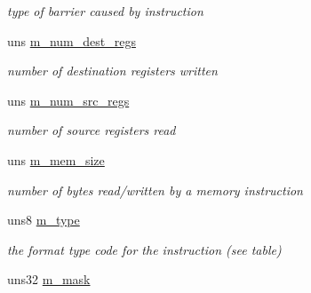 \begin{DoxyCompactItemize}
\begin{DoxyCompactList}\small\item\em type of barrier caused by instruction \item\end{DoxyCompactList}\item 
\hypertarget{structtable__info__s_a0119d841b793e83f3691aecf6487924c}{
uns \hyperlink{structtable__info__s_a0119d841b793e83f3691aecf6487924c}{m\_\-num\_\-dest\_\-regs}}
\label{structtable__info__s_a0119d841b793e83f3691aecf6487924c}

\begin{DoxyCompactList}\small\item\em number of destination registers written \item\end{DoxyCompactList}\item 
\hypertarget{structtable__info__s_a106b475b5a5a97141aa5a83d088e2dca}{
uns \hyperlink{structtable__info__s_a106b475b5a5a97141aa5a83d088e2dca}{m\_\-num\_\-src\_\-regs}}
\label{structtable__info__s_a106b475b5a5a97141aa5a83d088e2dca}

\begin{DoxyCompactList}\small\item\em number of source registers read \item\end{DoxyCompactList}\item 
\hypertarget{structtable__info__s_a6e0a853c6fe28121f394358f939433f4}{
uns \hyperlink{structtable__info__s_a6e0a853c6fe28121f394358f939433f4}{m\_\-mem\_\-size}}
\label{structtable__info__s_a6e0a853c6fe28121f394358f939433f4}

\begin{DoxyCompactList}\small\item\em number of bytes read/written by a memory instruction \item\end{DoxyCompactList}\item 
\hypertarget{structtable__info__s_a91ac042556dfc5df09e04449c5259ab0}{
uns8 \hyperlink{structtable__info__s_a91ac042556dfc5df09e04449c5259ab0}{m\_\-type}}
\label{structtable__info__s_a91ac042556dfc5df09e04449c5259ab0}

\begin{DoxyCompactList}\small\item\em the format type code for the instruction (see table) \item\end{DoxyCompactList}\item 
uns32 \hyperlink{structtable__info__s_aa8b53b8afc01a0a76b41fc2ab6b37574}{m\_\-mask}
\end{DoxyCompactItemize}


